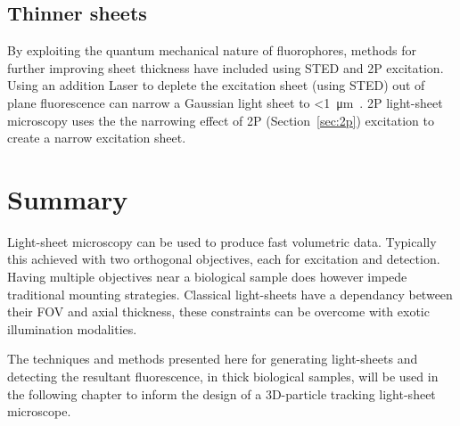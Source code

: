 \subsection{Thinner sheets}

By exploiting the quantum mechanical nature of \gls{fluorophore}s, methods for further improving sheet thickness have included using \gls{STED} and \gls{2P} excitation.
Using an addition \gls{Laser} to deplete the excitation sheet (using \gls{STED}) out of plane fluorescence can narrow a Gaussian light sheet to \SI{<1}{\micro\meter}~\cite{friedrich_sted-spim:_2011}.
\gls{2P} \gls{light-sheet} microscopy uses the the narrowing effect of \gls{2P} (Section~\ref{sec:2p}) excitation to create a narrow excitation sheet.

\section{Summary}

Light-sheet microscopy can be used to produce fast volumetric data.
Typically this achieved with two orthogonal objectives, each for excitation and detection.
Having multiple objectives near a biological sample does however impede traditional mounting strategies.
Classical light-sheets have a dependancy between their \gls{FOV} and axial thickness, these constraints can be overcome with exotic illumination modalities.

The techniques and methods presented here for generating \gls{light-sheet}s and detecting the resultant fluorescence, in thick biological samples, will be used in the following chapter to inform the design of a 3D-particle tracking \gls{light-sheet} microscope.


